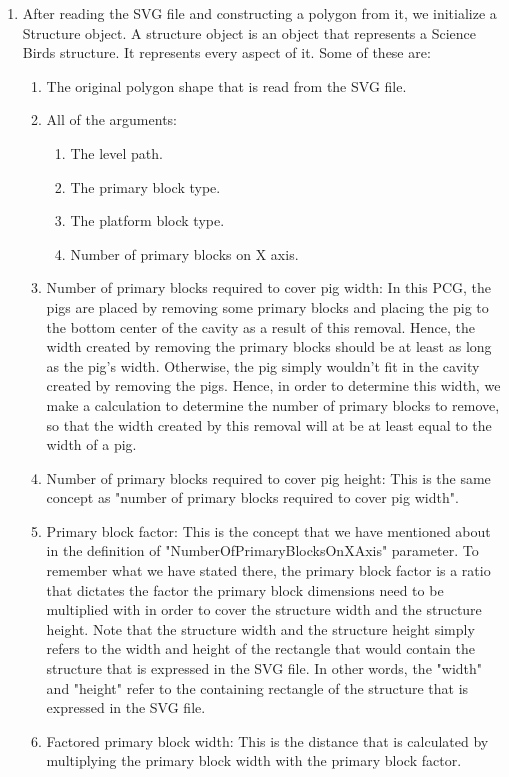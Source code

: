 \documentclass{dalthesis}
\begin{document}
\begin{enumerate}
  \item After reading the SVG file and constructing a polygon from it, we initialize a Structure object. A structure object is an object that represents a Science Birds structure. It represents every aspect of it. Some of these are:

  \begin{enumerate}
    \item The original polygon shape that is read from the SVG file.
    \item All of the arguments:
    \begin{enumerate}
      \item The level path.
      \item The primary block type.
      \item The platform block type.
      \item Number of primary blocks on X axis.
    \end{enumerate}
    \item Number of primary blocks required to cover pig width: In this PCG, the pigs are placed by removing some primary blocks and placing the pig to the bottom center of the cavity as a result of this removal. Hence, the width created by removing the primary blocks should be at least as long as the pig's width. Otherwise, the pig simply wouldn't fit in the cavity created by removing the pigs. Hence, in order to determine this width, we make a calculation to determine the number of primary blocks to remove, so that the width created by this removal will at be at least equal to the width of a pig.
    \item Number of primary blocks required to cover pig height: This is the same concept as "number of primary blocks required to cover pig width".
    \item Primary block factor: This is the concept that we have mentioned about in the definition of "NumberOfPrimaryBlocksOnXAxis" parameter. To remember what we have stated there, the primary block factor is a ratio that dictates the factor the primary block dimensions need to be multiplied with in order to cover the structure width and the structure height. Note that the structure width and the structure height simply refers to the width and height of the rectangle that would contain the structure that is expressed in the SVG file. In other words, the "width" and "height" refer to the containing rectangle of the structure that is expressed in the SVG file.
    \item Factored primary block width: This is the distance that is calculated by multiplying the primary block width with the primary block factor.

\end{enumerate}
\end{enumerate}
\end{document}
